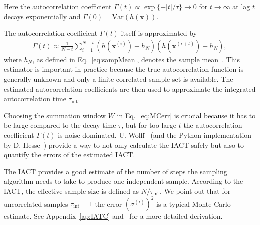 Here the autocorrelation coefficient $\Gamma(t) \propto \exp\{ - |t| /\tau \} \longrightarrow 0$ for $t \rightarrow \infty$ at lag $t$ decays exponentially and $\Gamma(0) =\text{Var}(h(\bm{x}) ) $.
\begin{mccorrection}
The autocorrelation coefficient $\Gamma(t)$ itself is approximated by
\begin{align*}
	\Gamma(t)
	\approx
	\frac{1}{N-t}
	\sum_{i=1}^{N-t}
	\left(h(\bm{x}^{(i)}) - \bar{h}_N\right)
	\left(h(\bm{x}^{(i+t)}) - \bar{h}_N\right),
\end{align*}
where $\bar{h}_N$, as defined in Eq.~\ref{eq:sampMean}, denotes the sample mean~\cite[p. 106]{wolff2002LecNot}.
This estimator is important in practice because the true autocorrelation function is generally unknown and only a finite correlated sample set is available.
The estimated autocorrelation coefficients are then used to approximate the integrated autocorrelation time $\tau_{\text{int}}$.
\end{mccorrection} 
Choosing the summation window $W$ in Eq.~\ref{eq:MCerr} is crucial because it has to be large compared to the decay time $\tau$, but for too large $t$ the autocorrelation coefficient $\Gamma(t)$ is noise-dominated.
U. Wolff~\cite{wolff2004monte} (and the Python implementation by D. Hesse~\cite{drikHesse}) provide a way to not only calculate the IACT safely but also to quantify the errors of the estimated IACT.

The IACT provides a good estimate of the number of steps the sampling algorithm needs to take to produce one independent sample.
According to the IACT, the effective sample size is defined as $N/ \tau_{\text{int}}$.
We point out that for uncorrelated samples $\tau_{\text{int}} = 1$ the error $(\sigma^{(i)})^2$ is a typical Monte-Carlo estimate.
See Appendix~\ref{ap:IATC} and~\cite{Sokal1997, wolff2004monte, wolff2002LecNot} for a more detailed derivation.

